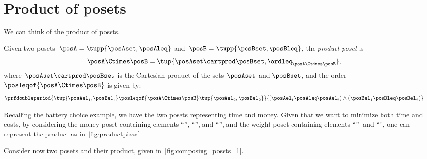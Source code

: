 
\section{Product of posets}
We can think of the product of posets.

\begin{definition}
    \label{def:productposet}
    Given two posets~$\posA=\tupp{\posAset, \posAleq}$ and~$\posB=\tupp{\posBset, \posBleq}$, the \emph{product poset} is
    \begin{equation}
        \posA\Ctimes \posB=\tup{\posAset \cartprod \posBset, \ordleq_{\posA\Ctimes \posB}},
    \end{equation}
    where~$\posAset \cartprod \posBset$ is the Cartesian product of the sets~$\posAset$ and $\posBset$, and the order~$\posleqof{\posA \Ctimes \posB}$ is given by:
    \begin{equation*}
        \prfdoubleperiod{\tup{\posAel_1, \posBel_1}
            \posleqof{\posA\Ctimes \posB}
            \tup{\posAel_2, \posBel_2}}{(\posAel_1 \posAleq \posAel_2) \wedge
            (\posBel_1 \posBleq \posBel_2)}
    \end{equation*}
\end{definition}
Recalling the battery choice example, we have the two posets representing time and money.
Given that we want to minimize both time and costs, by considering the money poset containing elements ``\poscheap'', ``\posmidrange'', and ``\posexpensive'', and the weight poset containing elements ``\poslight'', and ``\posheavy'', one can represent the product as in~\cref{fig:productpizza}.

\begin{figure*}[h!]
    \centering
    \caption{Product poset of time and weight for battery choices.}
    \label{fig:productpizza}
\end{figure*}

\begin{example}
    Consider now two posets and their product, given in~\cref{fig:composing_posets_1}.
    \begin{figure*}[h!]
        \caption{Product of two posets.}
        \label{fig:composing_posets_1}
    \end{figure*}
\end{example}
\vfill
\clearpage

